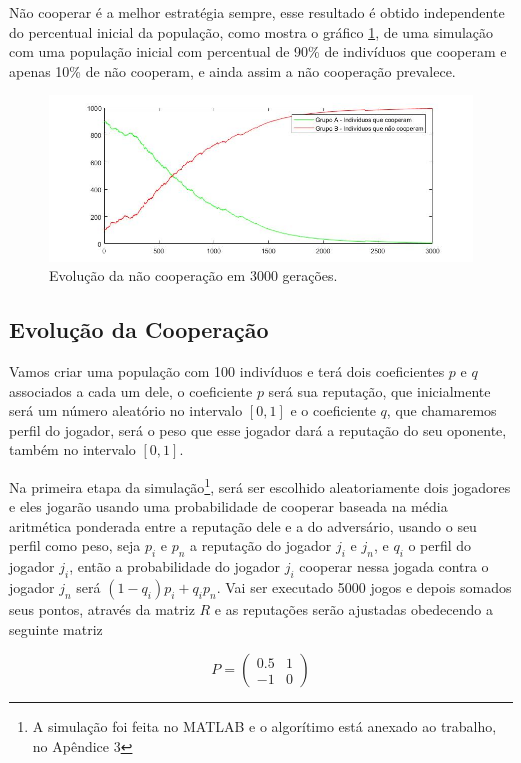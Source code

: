 Não cooperar é a melhor estratégia sempre, esse resultado é obtido independente do percentual inicial da população, como mostra o gráfico \ref{fig10}, de uma simulação com uma população inicial com percentual de 90\% de indivíduos que cooperam e apenas 10\% de não cooperam, e ainda assim a não cooperação prevalece.

\begin{figure}[H]
\centering
\includegraphics[width=14cm]{graf10.jpg}
\caption{Evolução da não cooperação em 3000 gerações.}
\label{fig10}
\end{figure}

\subsection{Evolução da Cooperação}

Vamos criar uma população com 100 indivíduos e terá dois coeficientes $p$ e $q$ associados a cada um dele, o coeficiente $p$ será sua reputação, que inicialmente será um número aleatório no intervalo $[0,1]$ e o coeficiente $q$, que chamaremos perfil do jogador, será o peso que esse jogador dará a reputação do seu oponente, também no intervalo $[0,1]$. 

Na primeira etapa da simulação\footnote{A simulação foi feita no MATLAB e o algorítimo está anexado ao trabalho, no Apêndice 3}, será ser escolhido aleatoriamente dois jogadores e eles jogarão usando uma probabilidade de cooperar baseada na média aritmética ponderada entre a reputação dele e a do adversário, usando o seu perfil como peso, seja $p_i$ e $p_n$ a reputação do jogador $j_i$ e $j_n$, e $q_i$ o perfil do jogador $j_i$, então a probabilidade do jogador $j_i$ cooperar nessa jogada contra o jogador $j_n$ será $(1-q_i)p_i+q_ip_n$. Vai ser executado 5000 jogos e depois somados seus pontos, através da matriz $R$ e as reputações serão ajustadas obedecendo a seguinte matriz

\begin{equation}\nonumber
P=\begin{pmatrix}
0.5 & 1\\-1 & 0
\end{pmatrix}
\end{equation}\vspace{0.1cm} 

